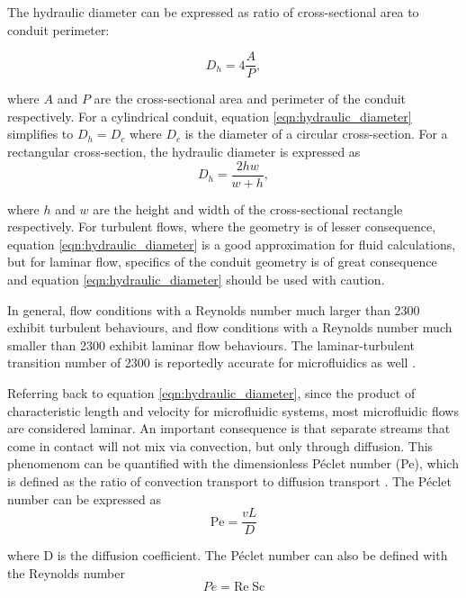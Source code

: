 \par The hydraulic diameter can be expressed as ratio of cross-sectional area to conduit perimeter:

\begin{equation}
    D_h = 4 \frac{A}{P},
    \label{eqn:hydraulic_diameter}
\end{equation}

\noindent where $A$ and $P$ are the cross-sectional area and perimeter of the conduit respectively. For a cylindrical conduit, equation \ref{eqn:hydraulic_diameter} simplifies to $D_h = D_c$ where $D_c$ is the diameter of a circular cross-section. For a rectangular cross-section, the hydraulic diameter is expressed as 
\begin{equation}
    D_h = \frac{2hw}{w+h},
\end{equation}

\noindent where $h$ and $w$ are the height and width of the cross-sectional rectangle respectively. For turbulent flows, where the geometry is of lesser consequence, equation \ref{eqn:hydraulic_diameter} is a good approximation for fluid calculations, but for laminar flow, specifics of the conduit geometry is of great consequence and equation \ref{eqn:hydraulic_diameter} should be used with caution.

\par In general, flow conditions with a Reynolds number much larger than 2300 exhibit turbulent behaviours, and flow conditions with a Reynolds number much smaller than 2300 exhibit laminar flow behaviours. The laminar-turbulent transition number of 2300 is reportedly accurate for microfluidics as well \cite{david_j._beebe_physics_2002}.

\par Referring back to equation \ref{eqn:hydraulic_diameter}, since the product of characteristic length and velocity for microfluidic systems, most microfluidic flows are considered laminar. An important consequence is that separate streams that come in contact will not mix via convection, but only through diffusion. This phenomenom can be quantified with the dimensionless P\'eclet number (Pe), which is defined as the ratio of convection transport to diffusion transport \cite{nguyen_micromixersreview_2005}. The P\'eclet number can be expressed as 
\begin{equation}
    \text{Pe} = \frac{vL}{D}
\end{equation}

\noindent where D is the diffusion coefficient. The P\'eclet number can also be defined with the Reynolds number
\begin{equation}
    Pe = \text{Re}\;\text{Sc}
\end{equation}

